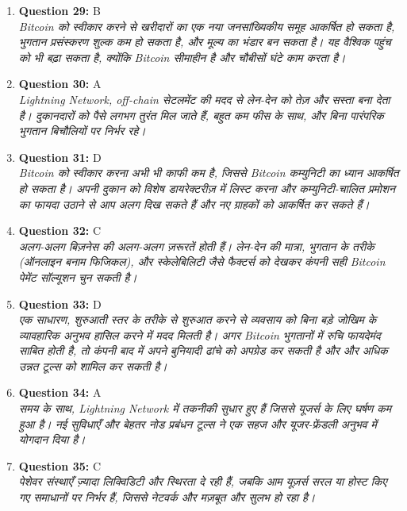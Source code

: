\documentclass[12pt,a4paper]{article}
\begin{document}
\begin{enumerate}
\item \textbf{Question 29:} B
\\ \textit{Bitcoin को स्वीकार करने से खरीदारों का एक नया जनसांख्यिकीय समूह आकर्षित हो सकता है, भुगतान प्रसंस्करण शुल्क कम हो सकता है, और मूल्य का भंडार बन सकता है। यह वैश्विक पहुंच को भी बढ़ा सकता है, क्योंकि Bitcoin सीमाहीन है और चौबीसों घंटे काम करता है।}

\item \textbf{Question 30:} A
\\ \textit{Lightning Network, off-chain सेटलमेंट की मदद से लेन-देन को तेज़ और सस्ता बना देता है। दुकानदारों को पैसे लगभग तुरंत मिल जाते हैं, बहुत कम फीस के साथ, और बिना पारंपरिक भुगतान बिचौलियों पर निर्भर रहे।}

\item \textbf{Question 31:} D
\\ \textit{Bitcoin को स्वीकार करना अभी भी काफी कम है, जिससे Bitcoin कम्युनिटी का ध्यान आकर्षित हो सकता है। अपनी दुकान को विशेष डायरेक्टरीज़ में लिस्ट करना और कम्युनिटी-चालित प्रमोशन का फायदा उठाने से आप अलग दिख सकते हैं और नए ग्राहकों को आकर्षित कर सकते हैं।}

\item \textbf{Question 32:} C
\\ \textit{अलग-अलग बिज़नेस की अलग-अलग ज़रूरतें होती हैं। लेन-देन की मात्रा, भुगतान के तरीके (ऑनलाइन बनाम फिजिकल), और स्केलेबिलिटी जैसे फैक्टर्स को देखकर कंपनी सही Bitcoin पेमेंट सॉल्यूशन चुन सकती है।}

\item \textbf{Question 33:} D
\\ \textit{एक साधारण, शुरुआती स्तर के तरीके से शुरुआत करने से व्यवसाय को बिना बड़े जोखिम के व्यावहारिक अनुभव हासिल करने में मदद मिलती है। अगर Bitcoin भुगतानों में रुचि फायदेमंद साबित होती है, तो कंपनी बाद में अपने बुनियादी ढांचे को अपग्रेड कर सकती है और और अधिक उन्नत टूल्स को शामिल कर सकती है।}

\item \textbf{Question 34:} A
\\ \textit{समय के साथ, Lightning Network में तकनीकी सुधार हुए हैं जिससे यूजर्स के लिए घर्षण कम हुआ है। नई सुविधाएँ और बेहतर नोड प्रबंधन टूल्स ने एक सहज और यूजर-फ्रेंडली अनुभव में योगदान दिया है।}

\item \textbf{Question 35:} C
\\ \textit{पेशेवर संस्थाएँ ज़्यादा लिक्विडिटी और स्थिरता दे रही हैं, जबकि आम यूज़र्स सरल या होस्ट किए गए समाधानों पर निर्भर हैं, जिससे नेटवर्क और मज़बूत और सुलभ हो रहा है।}


\end{enumerate}
\end{document}
